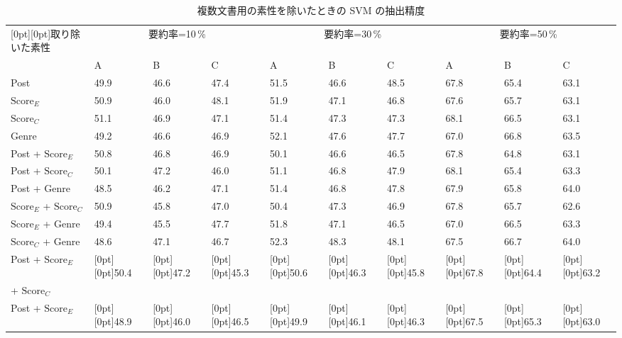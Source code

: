 \begin{table}[tb]
 \begin{center}
  \caption{複数文書用の素性を除いたときの SVM の抽出精度}
  \label{tab09}
  \begin{tabular}{l|lll|lll|lll}
   \hline
   \hline
   \raisebox{-1.8ex}[0pt][0pt]{取り除いた素性} & \multicolumn{3}{|c|}{要約率=10\,\%} & \multicolumn{3}{c|}{要約率=30\,\%} & \multicolumn{3}{c}{要約率=50\,\%} \\
\cline{2-10}
   & A & B & C & A & B & C & A & B & C \\
\hline
Post & 49.9 & 46.6 & 47.4 & 51.5 & 46.6 & 48.5 & 67.8 & 65.4 & 63.1 \\
$\mbox{Score}_E$ & 50.9 & 46.0 & 48.1 & 51.9 & 47.1 & 46.8 & 67.6 & 65.7 & 63.1 \\
$\mbox{Score}_C$ & 51.1 & 46.9 & 47.1 & 51.4 & 47.3 & 47.3 & 68.1 & 66.5 & 63.1 \\
Genre & 49.2 & 46.6 & 46.9 & 52.1 & 47.6 & 47.7 & 67.0 & 66.8 & 63.5 \\
\hline
Post + $\mbox{Score}_E$ & 50.8 & 46.8 & 46.9 & 50.1 & 46.6 & 46.5 & 67.8 & 64.8 & 63.1 \\
Post + $\mbox{Score}_C$ & 50.1 & 47.2 & 46.0 & 51.1 & 46.8 & 47.9 & 68.1 & 65.4 & 63.3 \\
Post + Genre & 48.5 & 46.2 & 47.1 & 51.4 & 46.8 & 47.8 & 67.9 & 65.8 & 64.0 \\
$\mbox{Score}_E$ + $\mbox{Score}_C$ & 50.9 & 45.8 & 47.0 & 50.4 & 47.3 & 46.9 & 67.8 & 65.7 & 62.6 \\
$\mbox{Score}_E$ + Genre & 49.4 & 45.5 & 47.7 & 51.8 & 47.1 & 46.5 & 67.0 & 66.5 & 63.3 \\
$\mbox{Score}_C$ + Genre & 48.6 & 47.1 & 46.7 & 52.3 & 48.3 & 48.1 & 67.5 & 66.7 & 64.0 \\
\hline
Post + $\mbox{Score}_E$ & \raisebox{-1.8ex}[0pt][0pt]{50.4} & \raisebox{-1.8ex}[0pt][0pt]{47.2} & \raisebox{-1.8ex}[0pt][0pt]{45.3} & \raisebox{-1.8ex}[0pt][0pt]{50.6} & \raisebox{-1.8ex}[0pt][0pt]{46.3} & \raisebox{-1.8ex}[0pt][0pt]{45.8} & \raisebox{-1.8ex}[0pt][0pt]{67.8} & \raisebox{-1.8ex}[0pt][0pt]{64.4} & \raisebox{-1.8ex}[0pt][0pt]{63.2} \\
+ $\mbox{Score}_C$ &  &  &  &  &  &  &  &  &  \\
Post + $\mbox{Score}_E$ & \raisebox{-1.8ex}[0pt][0pt]{48.9} & \raisebox{-1.8ex}[0pt][0pt]{46.0} & \raisebox{-1.8ex}[0pt][0pt]{46.5} & \raisebox{-1.8ex}[0pt][0pt]{49.9} & \raisebox{-1.8ex}[0pt][0pt]{46.1} & \raisebox{-1.8ex}[0pt][0pt]{46.3} & \raisebox{-1.8ex}[0pt][0pt]{67.5} & \raisebox{-1.8ex}[0pt][0pt]{65.3} & \raisebox{-1.8ex}[0pt][0pt]{63.0} \\

\end{tabular}
\end{center}
\end{table}
